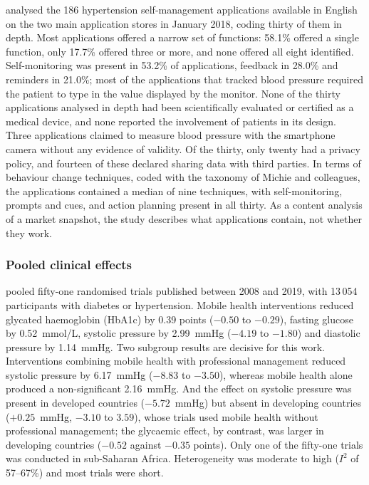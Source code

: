 \Textcite{alessa2019} analysed the 186 hypertension self-management applications available in English on the two main application stores in January 2018, coding thirty of them in depth. Most applications offered a narrow set of functions: 58.1\% offered a single function, only 17.7\% offered three or more, and none offered all eight identified. Self-monitoring was present in 53.2\% of applications, feedback in 28.0\% and reminders in 21.0\%; most of the applications that tracked blood pressure required the patient to type in the value displayed by the monitor. None of the thirty applications analysed in depth had been scientifically evaluated or certified as a medical device, and none reported the involvement of patients in its design. Three applications claimed to measure blood pressure with the smartphone camera without any evidence of validity. Of the thirty, only twenty had a privacy policy, and fourteen of these declared sharing data with third parties. In terms of behaviour change techniques, coded with the taxonomy of Michie and colleagues, the applications contained a median of nine techniques, with self-monitoring, prompts and cues, and action planning present in all thirty. As a content analysis of a market snapshot, the study describes what applications contain, not whether they work.

\subsubsection{Pooled clinical effects}\label{sec:efficacy}\label{sec:oversight}\label{sec:evidence-deficit}

\Textcite{mao2020} pooled fifty-one randomised trials published between 2008 and 2019, with 13\,054 participants with diabetes or hypertension. Mobile health interventions reduced glycated haemoglobin (HbA1c) by 0.39 points ($-0.50$ to $-0.29$), fasting glucose by 0.52~mmol/L, systolic pressure by 2.99~mmHg ($-4.19$ to $-1.80$) and diastolic pressure by 1.14~mmHg. Two subgroup results are decisive for this work. Interventions combining mobile health with professional management reduced systolic pressure by 6.17~mmHg ($-8.83$ to $-3.50$), whereas mobile health alone produced a non-significant 2.16~mmHg. And the effect on systolic pressure was present in developed countries ($-5.72$~mmHg) but absent in developing countries ($+0.25$~mmHg, $-3.10$ to $3.59$), whose trials used mobile health without professional management; the glycaemic effect, by contrast, was larger in developing countries ($-0.52$ against $-0.35$ points). Only one of the fifty-one trials was conducted in sub-Saharan Africa. Heterogeneity was moderate to high ($I^2$ of 57--67\%) and most trials were short.

